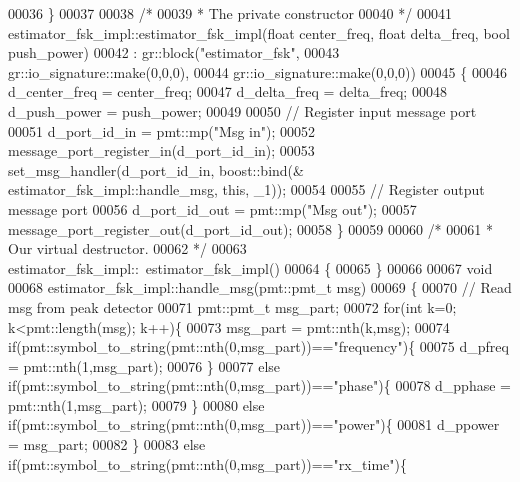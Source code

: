 \begin{DoxyCode}
00036     \}
00037 
00038     \textcolor{comment}{/*}
00039 \textcolor{comment}{     * The private constructor}
00040 \textcolor{comment}{     */}
00041     estimator_fsk_impl::estimator_fsk_impl(\textcolor{keywordtype}{float} center_freq, \textcolor{keywordtype}{float} delta\_freq, \textcolor{keywordtype}{bool} push\_power)
00042       : gr::block(\textcolor{stringliteral}{"estimator\_fsk"},
00043               gr::io\_signature::make(0,0,0),
00044               gr::io\_signature::make(0,0,0))
00045     \{
00046         d_center_freq = center_freq;
00047         d_delta_freq = delta\_freq;
00048         d_push_power = push\_power;
00049         
00050         \textcolor{comment}{// Register input message port}
00051         d_port_id_in = pmt::mp(\textcolor{stringliteral}{"Msg in"});
00052         message\_port\_register\_in(d_port_id_in);
00053         set\_msg\_handler(d_port_id_in, boost::bind(&
      estimator_fsk_impl::handle_msg, \textcolor{keyword}{this}, \_1));
00054         
00055         \textcolor{comment}{// Register output message port}
00056         d_port_id_out = pmt::mp(\textcolor{stringliteral}{"Msg out"});
00057         message\_port\_register\_out(d_port_id_out);
00058     \}
00059 
00060     \textcolor{comment}{/*}
00061 \textcolor{comment}{     * Our virtual destructor.}
00062 \textcolor{comment}{     */}
00063     estimator_fsk_impl::~estimator_fsk_impl()
00064     \{
00065     \}
00066     
00067     \textcolor{keywordtype}{void}
00068     estimator_fsk_impl::handle_msg(pmt::pmt\_t msg)
00069     \{
00070         \textcolor{comment}{// Read msg from peak detector}
00071         pmt::pmt\_t msg\_part;
00072         \textcolor{keywordflow}{for}(\textcolor{keywordtype}{int} k=0; k<pmt::length(msg); k++)\{
00073             msg\_part = pmt::nth(k,msg);
00074             \textcolor{keywordflow}{if}(pmt::symbol\_to\_string(pmt::nth(0,msg\_part))==\textcolor{stringliteral}{"frequency"})\{
00075                 d_pfreq = pmt::nth(1,msg\_part);
00076             \}
00077             \textcolor{keywordflow}{else} \textcolor{keywordflow}{if}(pmt::symbol\_to\_string(pmt::nth(0,msg\_part))==\textcolor{stringliteral}{"phase"})\{
00078                 d_pphase = pmt::nth(1,msg\_part);
00079             \}
00080             \textcolor{keywordflow}{else} \textcolor{keywordflow}{if}(pmt::symbol\_to\_string(pmt::nth(0,msg\_part))==\textcolor{stringliteral}{"power"})\{
00081                 d_ppower = msg\_part;
00082             \}
00083             \textcolor{keywordflow}{else} \textcolor{keywordflow}{if}(pmt::symbol\_to\_string(pmt::nth(0,msg\_part))==\textcolor{stringliteral}{"rx\_time"})\{

\end{DoxyCode}
